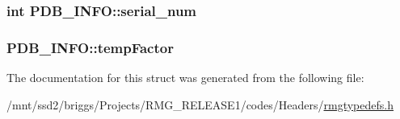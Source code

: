 \hypertarget{struct_p_d_b___i_n_f_o_adc6c71e1115a1ba128651d96bbc73b85}{
\subsubsection[{serial\-\_\-num}]{\setlength{\rightskip}{0pt plus 5cm}int P\-D\-B\-\_\-\-I\-N\-F\-O\-::serial\-\_\-num}}\label{struct_p_d_b___i_n_f_o_adc6c71e1115a1ba128651d96bbc73b85}
\hypertarget{struct_p_d_b___i_n_f_o_a68569dce5b25d6bcf637f7506430f8da}{
\subsubsection[{temp\-Factor}]{ P\-D\-B\-\_\-\-I\-N\-F\-O\-::temp\-Factor}}\label{struct_p_d_b___i_n_f_o_a68569dce5b25d6bcf637f7506430f8da}


The documentation for this struct was generated from the following file\-:\begin{DoxyCompactItemize}
\item 
/mnt/ssd2/briggs/\-Projects/\-R\-M\-G\-\_\-\-R\-E\-L\-E\-A\-S\-E1/codes/\-Headers/\hyperlink{rmgtypedefs_8h}{rmgtypedefs.\-h}\end{DoxyCompactItemize}
